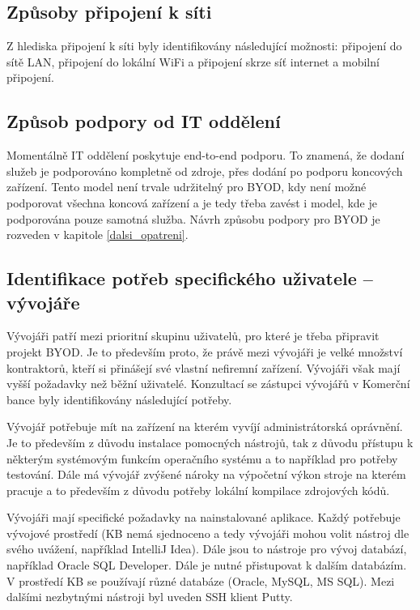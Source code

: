 \subsection{Způsoby připojení k síti}
Z hlediska připojení k síti byly identifikovány následující možnosti: připojení do sítě LAN, připojení do lokální WiFi a připojení skrze síť internet a mobilní připojení.

\subsection{Způsob podpory od IT oddělení}
Momentálně IT oddělení poskytuje end-to-end podporu. To znamená, že dodaní služeb je podporováno kompletně od zdroje, přes dodání po podporu koncových zařízení. Tento model není trvale udržitelný pro BYOD, kdy není možné podporovat všechna koncová zařízení a je tedy třeba zavést i model, kde je podporována pouze samotná služba. Návrh způsobu podpory pro BYOD je rozveden v kapitole \ref{dalsi_opatreni}.

\subsection{Identifikace potřeb specifického uživatele -- vývojáře}\label{potreby_vyvojar}
Vývojáři patří mezi prioritní skupinu uživatelů, pro které je třeba připravit projekt BYOD. Je to především proto, že právě mezi vývojáři je velké množství kontraktorů, kteří si přinášejí své vlastní nefiremní zařízení. Vývojáři však mají vyšší požadavky než běžní uživatelé. Konzultací se zástupci vývojářů v Komerční bance byly identifikovány následující potřeby. 

Vývojář potřebuje mít na zařízení na kterém vyvíjí administrátorská oprávnění. Je to především z důvodu instalace pomocných nástrojů, tak z důvodu přístupu k některým systémovým funkcím operačního systému a to například pro potřeby testování. Dále má vývojář zvýšené nároky na výpočetní výkon stroje na kterém pracuje a to především z důvodu potřeby lokální kompilace zdrojových kódů. 

Vývojáři mají specifické požadavky na nainstalované aplikace. Každý potřebuje vývojové prostředí (KB nemá sjednoceno a tedy vývojáři mohou volit nástroj dle svého uvážení, například IntelliJ Idea). Dále jsou to nástroje pro vývoj databází, například Oracle SQL Developer. Dále je nutné přistupovat k dalším databázím. V prostředí KB se používají různé databáze (Oracle, MySQL, MS SQL). Mezi dalšími nezbytnými nástroji byl uveden SSH klient Putty.

